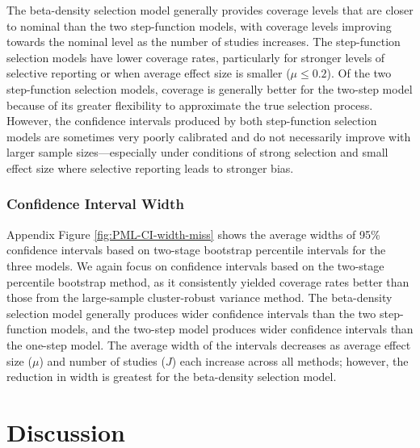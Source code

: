 \documentclass[
  american,
  man, donotrepeattitle,floatsintext]{apa7}
\begin{document}
The beta-density selection model generally provides coverage levels that are closer to nominal than the two step-function models, with coverage levels improving towards the nominal level as the number of studies increases.
The step-function selection models have lower coverage rates, particularly for stronger levels of selective reporting or when average effect size is smaller (\(\mu \leq 0.2\)).
Of the two step-function selection models, coverage is generally better for the two-step model because of its greater flexibility to approximate the true selection process.
However, the confidence intervals produced by both step-function selection models are sometimes very poorly calibrated and do not necessarily improve with larger sample sizes---especially under conditions of strong selection and small effect size where selective reporting leads to stronger bias.

\subsubsection{Confidence Interval Width}\label{confidence-interval-width-1}

Appendix Figure \ref{fig:PML-CI-width-miss} shows the average widths of 95\% confidence intervals based on two-stage bootstrap percentile intervals for the three models.
We again focus on confidence intervals based on the two-stage percentile bootstrap method, as it consistently yielded coverage rates better than those from the large-sample cluster-robust variance method.
The beta-density selection model generally produces wider confidence intervals than the two step-function models, and the two-step model produces wider confidence intervals than the one-step model. The average width of the intervals decreases as average effect size (\(\mu\)) and number of studies (\(J\)) each increase across all methods; however, the reduction in width is greatest for the beta-density selection model.

\section{Discussion}\label{discussion}
\end{document}
